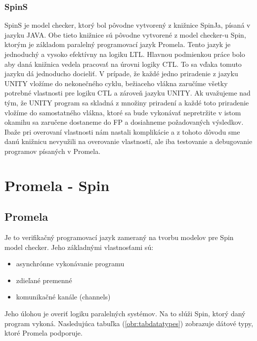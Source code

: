\subsubsection{SpinS}
SpinS je model checker, ktorý bol pôvodne vytvorený z knižnice SpinJa, písaná v jazyku JAVA. Obe tieto 
knižnice sú pôvodne vytvorené z model checker-u Spin, ktorým je základom paralelný programovací jazyk
Promela. Tento jazyk je jednoduchý a vysoko efektívny na logiku LTL. Hlavnou podmienkou práce bolo
aby daná knižnica vedela pracovať na úrovni logiky CTL. To sa vďaka tomuto jazyku dá jednoducho docieliť.
V prípade, že každé jedno priradenie z jazyku UNITY vložíme do nekonečného cyklu, bežiaceho vlákna zaručíme 
všetky potrebné vlastnosti pre logiku CTL a zároveň jazyku UNITY. Ak uvažujeme nad tým, že UNITY program 
sa skladná z množiny priradení a každé toto priradenie vložíme do samostatného vlákna, ktoré
sa bude vykonávať nepretržite v istom okamihu sa zaručene dostaneme do FP a dosiahneme 
požadovaných výsledkov. Ibaže pri overovaní vlastnosti nám nastali komplikácie a z tohoto dôvodu sme danú 
knižnicu nevyužili na overovanie vlastností, ale iba testovanie a debugovanie programov písaných v Promela.

\section{Promela - Spin}
\subsection{Promela}
Je to verifikačný programovací jazyk zameraný na tvorbu modelov pre Spin model checker. Jeho základnými
vlastnosťami sú:

\begin{itemize}
    \item asynchrónne vykonávanie programu
    \item zdieľané premenné
    \item komunikačné kanále (channels)
\end{itemize}

Jeho úlohou je overiť logiku paralelných systémov. Na to slúži Spin, ktorý daný program vykoná. 
Nasledujúca tabuľka (\ref{obr:tabdatatypes}) zobrazuje dátové typy, ktoré Promela podporuje.


